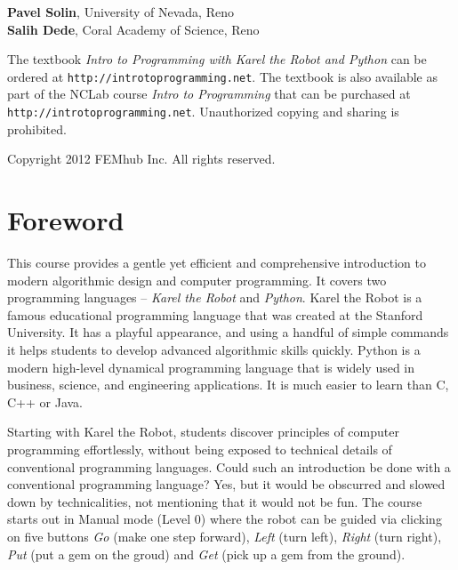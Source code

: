 \documentclass[article,A4,12pt]{llncs}
\newif\iffullversion
\begin{document}
\begin{center}
\iffullversion
\else
\centerline{\huge \color{red}{PREVIEW}}
\fi
\vfill
{\large
{\bf Pavel Solin}, University of Nevada, Reno\\
{\bf Salih Dede}, Coral Academy of Science, Reno
}
\end{center}
\newpage
\vbox{}
\vfill
\begin{center}
{
The textbook {\em Intro to Programming with Karel the Robot and Python} 
can be ordered at {\tt http://introtoprogramming.net}. The textbook 
is also available as part of the NCLab course {\em Intro to Programming} 
that can be purchased at {\tt http://introtoprogramming.net}.
Unauthorized copying and sharing is prohibited.
}
\vfill

Copyright 2012 FEMhub Inc. All rights reserved.
\end{center}


\newpage
\setcounter{tocdepth}{2}
\tableofcontents

\newpage

\pagestyle{plain}
\setcounter{page}{1}

\pagestyle{plain}
\setcounter{page}{1}
\section*{Foreword}
This course provides a gentle yet efficient and comprehensive introduction to modern algorithmic 
design and computer programming. It covers two programming languages -- {\em Karel the Robot} 
and {\em Python}. Karel the Robot is a famous 
educational programming language that was created at the Stanford University. It has a playful 
appearance, and using a handful of simple commands it helps students to develop advanced algorithmic 
skills quickly. Python is a modern high-level dynamical programming language that is widely 
used in business, science, and engineering applications. It is much easier to learn than C, C++ or 
Java.

Starting with Karel the Robot, students discover principles of computer programming effortlessly,
without being exposed to technical details of conventional programming languages.
Could such an introduction be done with a conventional programming language? Yes, but 
it would be obscurred and slowed down by technicalities, not mentioning that it would 
not be fun. The course starts out in Manual mode (Level 0) where the robot can be guided via 
clicking on five buttons {\em Go} (make one step forward), {\em Left} (turn left), {\em Right} 
(turn right), {\em Put} (put a gem on the groud) and {\em Get} (pick up a gem from the ground). 
\end{document}
